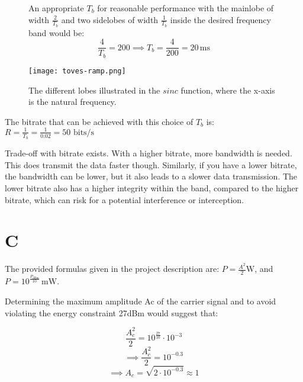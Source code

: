 \documentclass{article}[11]
\begin{document}
\begin{figure}[H]
  \begin{minipage}{0.5\textwidth}
    An appropriate $T_b$ for reasonable performance with the mainlobe of width $\frac{2}{T_b}$ and two sidelobes of width $\frac{1}{T_b}$ inside the desired frequency band would be:
    \begin{equation}
      \frac{4}{T_b} = 200 \implies T_b = \frac{4}{200} = 20 \, \text{ms}
    \end{equation}
  \end{minipage}\hfill
  \begin{minipage}{0.5\textwidth}
    \centering
    \texttt{[image: toves-ramp.png]}
    \caption{The different lobes illustrated in the $sinc$ function, where the x-axis is the natural frequency.}
    \label{fig:task}
  \end{minipage}
\end{figure}

The bitrate that can be achieved with this choice of $T_b$ is: $R = \frac{1}{T_b} = \frac{1}{0.02} =50 \text{ bits/s}$


Trade-off with bitrate exists. With a higher bitrate, more bandwidth is needed. This does transmit the data faster though. Similarly, if you have a lower bitrate, the bandwidth can be lower, but it also leads to a slower data transmission. The lower bitrate also has a higher integrity within the band, compared to the higher bitrate, which can risk for a potential interference or interception.

\section{C}

The provided formulas given in the project description are: $P = \frac{A^2}{2} \text{W}$, and $P = 10^{\frac{P_{\text{dBm}}}{10}} \, \text{mW}$.

Determining the maximum amplitude Ac of the carrier signal and to avoid violating the energy constraint 27dBm would suggest that:

\begin{equation}
    \frac{A_c^2}{2} = 10^{\frac{27}{10}} \cdot 10^{-3}
\end{equation}
\begin{equation}
\implies
    \frac{A_c^2}{2} = 10^{-0.3}
\end{equation}
\begin{equation}
\implies
    A_c = \sqrt{2 \cdot 10^{-0.3}} \approx 1
\end{equation}
\end{document}
